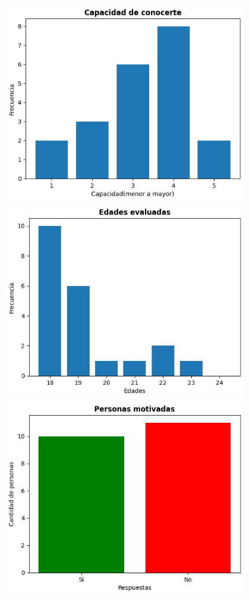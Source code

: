 \begin{center}
\includegraphics[width=0.8\textwidth]{./assets/img/grafica-1.jpeg}
\includegraphics[width=0.8\textwidth]{./assets/img/grafica-2.jpeg}
\includegraphics[width=0.8\textwidth]{./assets/img/grafica-3.jpeg}

\end{center}
